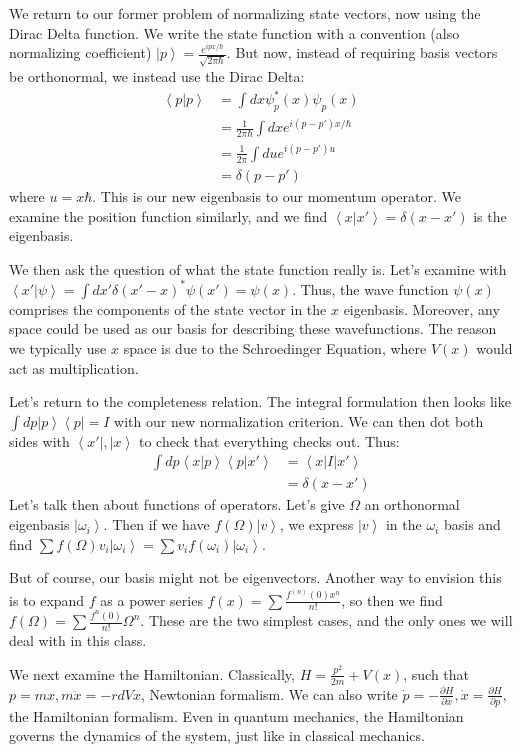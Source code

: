 \documentclass[10pt]{report}
\newcommand{\bra}[1]{\left<#1\right|}
\newcommand{\ket}[1]{\left|#1\right>}
\newcommand{\dotp}[2]{\left<#1\left.\right|#2\right>}
\newcommand{\pd}[2]{\frac{\partial #1}{\partial#2}}
\begin{document}
We return to our former problem of normalizing state vectors, now using the Dirac Delta function. We write the state function with a convention (also normalizing coefficient) $\ket{p} = \frac{e^{ipx/\hbar}}{\sqrt{2\pi\hbar}}$. But now, instead of requiring basis vectors be orthonormal, we instead use the Dirac Delta:
\begin{align}
	\dotp{p}{p} &= \int dx \psi_p^*(x)\psi_p(x) \\
	&= \frac{1}{2\pi\hbar}\int dx e^{i(p-p')x/\hbar}\\
	&= \frac{1}{2\pi} \int du e^{i(p-p')u}\\
	&= \delta(p-p')
\end{align}
where $u=x\hbar$. This is our new eigenbasis to our momentum operator. We examine the position function similarly, and we find $\dotp{x}{x'}=\delta(x-x')$ is the eigenbasis. 

We then ask the question of what the state function really is. Let's examine with $\dotp{x'}{\psi} = \int dx' \delta(x'-x)^*\psi(x') = \psi(x)$. Thus, the wave function $\psi(x)$ comprises the components of the state vector in the $x$ eigenbasis. Moreover, any space could be used as our basis for describing these wavefunctions. The reason we typically use $x$ space is due to the Schroedinger Equation, where $V(x)$ would act as multiplication. 

Let's return to the completeness relation. The integral formulation then looks like $\int dp \ket{p}\bra{p} = I$ with our new normalization criterion. We can then dot both sides with $\bra{x'},\ket{x}$ to check that everything checks out. Thus:
\begin{align}
	\int dp \dotp{x}{p}\dotp{p}{x'} &= \bra{x}I\ket{x'} \\
	&= \delta(x-x')
\end{align}
Let's talk then about functions of operators. Let's give $\Omega$ an orthonormal eigenbasis $\ket{\omega_i}$. Then if we have $f(\Omega)\ket{v}$, we express $\ket{v}$ in the $\omega_i$ basis and find $\sum f(\Omega)v_i\ket{\omega_i} = \sum v_if(\omega_i)\ket{\omega_i}$. 

But of course, our basis might not be eigenvectors. Another way to envision this is to expand $f$ as a power series $f(x) = \sum \frac{f^{(n)}(0)x^n}{n!}$, so then we find $f(\Omega) = \sum \frac{f^n(0)}{n!}\Omega^n$. These are the two simplest cases, and the only ones we will deal with in this class.

We next examine the Hamiltonian. Classically, $H=\frac{p^2}{2m}+V(x)$, such that $p=mx,m\ddot{x}=-rd{V}{x}$, Newtonian formalism. We can also write $\dot{p}=-\pd{H}{x},\dot{x}=\pd{H}{p}$, the Hamiltonian formalism. Even in quantum mechanics, the Hamiltonian governs the dynamics of the system, just like in classical mechanics. 
\end{document}
